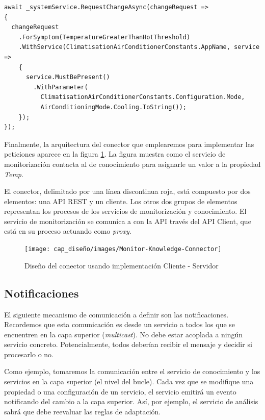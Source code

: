 \begin{lstlisting}[language={[Sharp]C},caption={Implementación de la misma petición siguiendo el patrón \emph{builder}.},captionpos=b, label=ls:api-cliente-request-builder]
await _systemService.RequestChangeAsync(changeRequest =>
{
  changeRequest
    .ForSymptom(TemperatureGreaterThanHotThreshold)
    .WithService(ClimatisationAirConditionerConstants.AppName, service =>
    {
      service.MustBePresent()
        .WithParameter(
          ClimatisationAirConditionerConstants.Configuration.Mode,
          AirConditioningMode.Cooling.ToString());
    });
});
\end{lstlisting}

Finalmente, la arquitectura del conector que emplearemos para implementar las peticiones aparece en la figura \ref{fig:monitor-knowledge-connector-architecture}. La figura muestra como el servicio de monitorización contacta al de conocimiento para asignarle un valor a la propiedad \emph{Temp}.

El conector, delimitado por una línea discontinua roja, está compuesto por dos elementos: una API REST y un cliente. Los otros dos grupos de elementos representan los procesos de los servicios de monitorización y conocimiento. El servicio de monitorización se comunica a con la API través del API Client, que está en su proceso actuando como \emph{proxy}.

\begin{figure}[h!]
  \centering
  \texttt{[image: cap\_diseño/images/Monitor-Knowledge-Connector]}
  \caption{Diseño del conector usando implementación Cliente - Servidor}
  \label{fig:monitor-knowledge-connector-architecture}
\end{figure}

\pagebreak

\subsection{Notificaciones}

El siguiente mecanismo de comunicación a definir son las notificaciones. Recordemos que esta comunicación es desde un servicio a todos los que se encuentren en la capa superior (\emph{multicast}). No debe estar acoplada a ningún servicio concreto. Potencialmente, todos deberían recibir el mensaje y decidir si procesarlo o no.

Como ejemplo, tomaremos la comunicación entre el servicio de conocimiento y los servicios en la capa superior (el nivel del bucle). Cada vez que se modifique una propiedad o una configuración de un servicio, el servicio emitirá un evento notificando del cambio a la capa superior. Así, por ejemplo, el servicio de análisis sabrá que debe reevaluar las reglas de adaptación.

